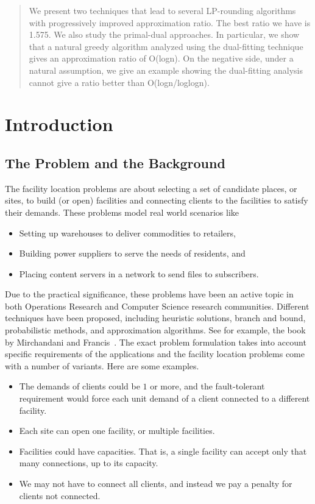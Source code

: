 \documentclass[oneside,final]{ucr}
\begin{document}
\begin{frontmatter}
\begin{abstract}
  We present two techniques that lead to several LP-rounding
  algorithms with progressively improved approximation
  ratio. The best ratio we have is 1.575. We also study the
  primal-dual approaches. In particular, we show that a
  natural greedy algorithm analyzed using the dual-fitting
  technique gives an approximation ratio of O(logn). On the
  negative side, under a natural assumption, we give an
  example showing the dual-fitting analysis cannot give a
  ratio better than O(logn/loglogn).
\end{abstract}

\tableofcontents
\listoffigures
\listoftables

\end{frontmatter}

\chapter{Introduction} \label{ch: intro}

\section{The Problem and the Background}
The facility location problems are about selecting a set of
candidate places, or sites, to build (or open) facilities
and connecting clients to the facilities to satisfy their
demands. These problems model real world scenarios like
\begin{itemize}
\item Setting up warehouses to deliver commodities to
  retailers,
\item Building power suppliers to serve the needs of
  residents, and
\item Placing content servers in a network to send files to
  subscribers.
\end{itemize}

Due to the practical significance, these problems have been
an active topic in both Operations Research and Computer
Science research communities. Different techniques have been
proposed, including heuristic solutions, branch and bound,
probabilistic methods, and approximation algorithms. See for
example, the book by Mirchandani and
Francis~\cite{Francis90}. The exact problem formulation
takes into account specific requirements of the applications
and the facility location problems come with a number of
variants. Here are some examples.
\begin{itemize}
\item The demands of clients could be $1$ or more, and the
  fault-tolerant requirement would force each unit demand of
  a client connected to a different facility.
\item Each site can open one facility, or multiple
  facilities.
\item Facilities could have capacities. That is, a single
  facility can accept only that many connections, up to its
  capacity.
\item We may not have to connect all clients, and instead we
  pay a penalty for clients not connected.
\end{itemize}
\end{document}
